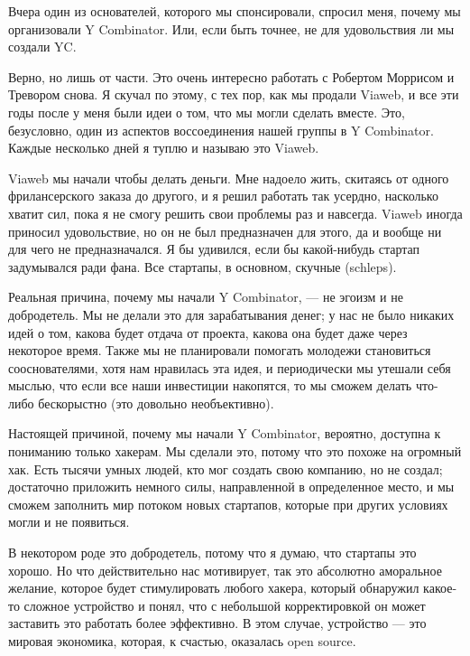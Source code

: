 \documentclass[ebook,12pt,oneside,openany]{memoir}
\date{}
\begin{document}
\maketitle

Вчера один из основателей, которого мы спонсировали, спросил меня,
почему мы организовали Y Combinator. Или, если быть точнее, не для
удовольствия ли мы создали YC.

Верно, но лишь от части. Это очень интересно работать с Робертом
Моррисом и Тревором снова. Я скучал по этому, с тех пор, как мы
продали Viaweb, и все эти годы после у меня были идеи о том, что мы
могли сделать вместе. Это, безусловно, один из аспектов воссоединения
нашей группы в Y Combinator. Каждые несколько дней я туплю и называю
это Viaweb.

Viaweb мы начали чтобы делать деньги. Мне надоело жить, скитаясь от
одного фрилансерского заказа до другого, и я решил работать так
усердно, насколько хватит сил, пока я не смогу решить свои проблемы
раз и навсегда. Viaweb иногда приносил удовольствие, но он не был
предназначен для этого, да и вообще ни для чего не предназначался. Я
бы удивился, если бы какой-нибудь стартап задумывался ради фана. Все
стартапы, в основном, скучные (schleps).

Реальная причина, почему мы начали Y Combinator, — не эгоизм и не
добродетель. Мы не делали это для зарабатывания денег; у нас не было
никаких идей о том, какова будет отдача от проекта, какова она будет
даже через некоторое время. Также мы не планировали помогать молодежи
становиться сооснователями, хотя нам нравилась эта идея, и
периодически мы утешали себя мыслью, что если все наши инвестиции
накопятся, то мы сможем делать что-либо бескорыстно (это довольно
необъективно).

Настоящей причиной, почему мы начали Y Combinator, вероятно, доступна
к пониманию только хакерам. Мы сделали это, потому что это похоже на
огромный хак. Есть тысячи умных людей, кто мог создать свою компанию,
но не создал; достаточно приложить немного силы, направленной в
определенное место, и мы сможем заполнить мир потоком новых стартапов,
которые при других условиях могли и не появиться.

В некотором роде это добродетель, потому что я думаю, что стартапы это
хорошо. Но что действительно нас мотивирует, так это абсолютно
аморальное желание, которое будет стимулировать любого хакера, который
обнаружил какое-то сложное устройство и понял, что с небольшой
корректировкой он может заставить это работать более эффективно. В
этом случае, устройство — это мировая экономика, которая, к счастью,
оказалась open source.
\end{document}
